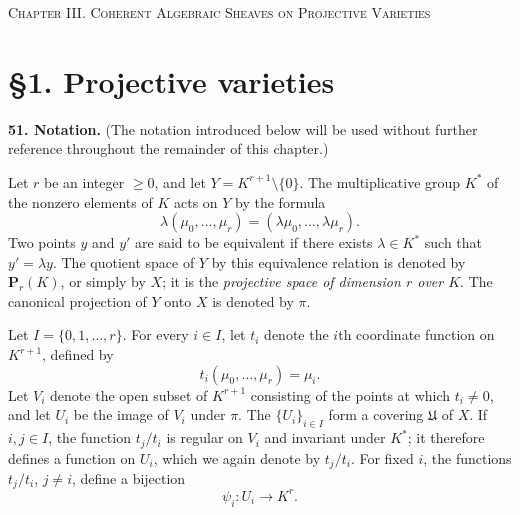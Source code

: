 
\label{fac:III}
\begin{center}
{\Large\textsc{Chapter III. Coherent Algebraic Sheaves on Projective Varieties}}
\end{center}

\label{fac:III:1}
\section*{\S1. Projective varieties}

\label{fac:III:1:no:51}
\textbf{51. Notation.}
(The notation introduced below will be used without further reference
throughout the remainder of this chapter.)

Let $r$ be an integer $\geq0$, and let
$Y=K^{r+1}\setminus\{0\}$. The multiplicative group $K^*$ of the nonzero
elements of $K$ acts on $Y$ by the formula
\label{fac:III:1:no:51:formula:scalar-action}
\[
\lambda(\mu_0,\ldots,\mu_r)
  =(\lambda\mu_0,\ldots,\lambda\mu_r).
\]
\label{fac:III:1:no:51:def:projective-space}
Two points $y$ and $y'$ are said to be equivalent if there exists
$\lambda\in K^*$ such that $y'=\lambda y$. The quotient space of $Y$ by
this equivalence relation is denoted by $\mathbf{P}_r(K)$, or simply by $X$;
it is the \textit{projective space of dimension $r$ over $K$}. The canonical
projection of $Y$ onto $X$ is denoted by $\pi$.

Let $I=\{0,1,\ldots,r\}$. For every $i\in I$, let $t_i$ denote the $i$th
coordinate function on $K^{r+1}$, defined by
\label{fac:III:1:no:51:formula:coordinate}
\[
t_i(\mu_0,\ldots,\mu_r)=\mu_i.
\]
\label{fac:III:1:no:51:cover}
Let $V_i$ denote the open subset of $K^{r+1}$ consisting of the points at
which $t_i\neq0$, and let $U_i$ be the image of $V_i$ under $\pi$. The
$\{U_i\}_{i\in I}$ form a covering $\mathfrak{U}$ of $X$. If $i,j\in I$,
the function $t_j/t_i$ is regular on $V_i$ and invariant under $K^*$; it
therefore defines a function on $U_i$, which we again denote by $t_j/t_i$.
For fixed $i$, the functions $t_j/t_i$, $j\neq i$, define a bijection
\label{fac:III:1:no:51:map:affine-chart}
\[
\psi_i:U_i\longrightarrow K^r.
\]

